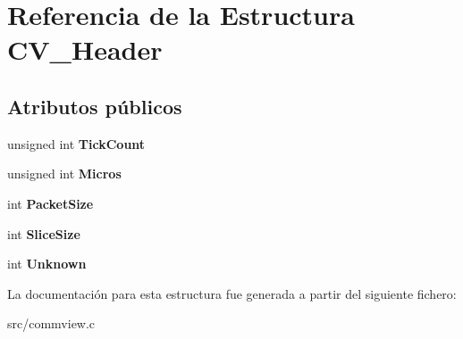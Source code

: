 \hypertarget{struct_c_v___header}{
\section{Referencia de la Estructura CV\_\-Header}
\label{struct_c_v___header}
}
\subsection*{Atributos públicos}
\begin{DoxyCompactItemize}
\item 
\hypertarget{struct_c_v___header_a4080f9b106600c495a89e5dfda971f3b}{
unsigned int {\bfseries TickCount}}
\label{struct_c_v___header_a4080f9b106600c495a89e5dfda971f3b}

\item 
\hypertarget{struct_c_v___header_a771e67c0e0df1f8a00c4f28921f5a82f}{
unsigned int {\bfseries Micros}}
\label{struct_c_v___header_a771e67c0e0df1f8a00c4f28921f5a82f}

\item 
\hypertarget{struct_c_v___header_a5bc37ee6a8bfc0319d84c071f0e1c7cf}{
int {\bfseries PacketSize}}
\label{struct_c_v___header_a5bc37ee6a8bfc0319d84c071f0e1c7cf}

\item 
\hypertarget{struct_c_v___header_aa5db6b3755c7f0c1bf5871d96400b40b}{
int {\bfseries SliceSize}}
\label{struct_c_v___header_aa5db6b3755c7f0c1bf5871d96400b40b}

\item 
\hypertarget{struct_c_v___header_ab9b440e9e5193bea3cd149fc59f5b25f}{
int {\bfseries Unknown}}
\label{struct_c_v___header_ab9b440e9e5193bea3cd149fc59f5b25f}

\end{DoxyCompactItemize}


La documentación para esta estructura fue generada a partir del siguiente fichero:\begin{DoxyCompactItemize}
\item 
src/commview.c\end{DoxyCompactItemize}
